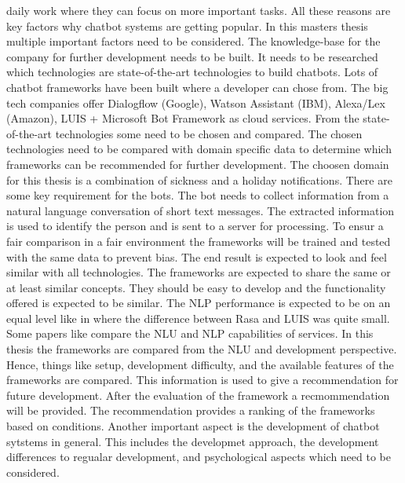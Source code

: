 daily work where they can focus on more important tasks.
All these reasons are key factors why chatbot systems are getting popular.
In this masters thesis multiple important factors need to be considered.
The knowledge-base for the company for further development needs to be built.
It needs to be researched which technologies are state-of-the-art technologies to build chatbots.
Lots of chatbot frameworks have been built where a developer can chose from.
The big tech companies offer Dialogflow (Google), Watson Assistant (IBM),
Alexa/Lex (Amazon), LUIS + Microsoft Bot Framework as cloud services.
From the state-of-the-art technologies some need to be chosen and compared.
The chosen technologies need to be compared with domain specific data to determine which frameworks can be 
recommended for further development.
The choosen domain for this thesis is a combination of sickness and a holiday notifications.
There are some key requirement for the bots.
The bot needs to collect information from a natural language conversation of short text messages.
The extracted information is used to identify the person and is sent to a server for processing.
To ensur a fair comparison in a fair environment the frameworks will be trained and tested 
with the same data to prevent bias.
The end result is expected to look and feel similar with all technologies.
The frameworks are expected to share the same or at least similar concepts.
They should be easy to develop and the functionality offered is expected to be similar.
The NLP performance is expected to be on an equal level like in \citet{braunEvaluatingNLU} where the difference 
between Rasa and LUIS was quite small.
Some papers like \citet{braunEvaluatingNLU} compare the NLU and NLP capabilities of services.
In this thesis the frameworks are compared from the NLU and development perspective.
Hence, things like setup, development difficulty, and 
the available features of the frameworks are compared.
This information is used to give a recommendation for future development.
After the evaluation of the framework a recmommendation will be provided.
The recommendation provides a ranking of the frameworks based on conditions. 
Another important aspect is the development of chatbot sytstems in general.
This includes the developmet approach, the development differences to 
regualar development, and psychological aspects which need to be considered.


